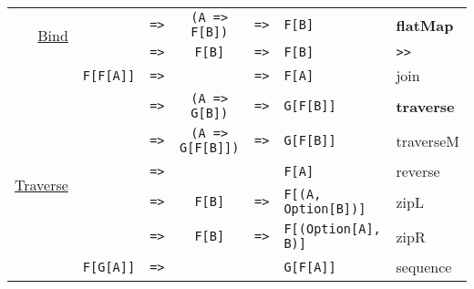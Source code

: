 \documentclass{tufte-handout}
\newcommand{\fa}{F[A]}
\newcommand{\fb}{F[B]}
\newcommand{\rarr}{\texttt{=>}}
\newcommand{\fTwo}[2]{\texttt{#1} & \rarr & & & \texttt{#2}}
\newcommand{\fThree}[3]{\texttt{#1} & \rarr & \texttt{#2} & \rarr & \texttt{#3}}
\newcommand{\sdocUrl}[1]{http://docs.typelevel.org/api/scalaz/stable/7.0.4/doc/\#scalaz.#1}
\newcommand{\sdocHref}[1]{\href{\sdocUrl{#1}}{#1}}
\begin{document}
\begin{table}[ht]
\begin{tabular}{rrcclll}
    \multirow{2}{*}{\sdocHref{Bind}}
      & \fThree{\multirow{2}{*}{\fa}}{(A => F[B])}{\fb} & \textbf{flatMap} \\
      & \fThree{}{\fb}{\fb} & \verb$>>$ \\
      & \fThree{F[F[A]]}{}{\fa} & join \\[.5cm]
    \multirow{6}{*}{\sdocHref{Traverse}}
      & \fThree{\multirow{5}{*}{\fa}}{(A => G[B])}{G[F[B]]} & \textbf{traverse} \\
      & \fThree{}{(A => G[F[B]])}{G[F[B]]} & traverseM \\
      & \fTwo{}{\fa} & reverse \\
      & \fThree{}{\fb}{F[(A, Option[B])]} & zipL \\
      & \fThree{}{\fb}{F[(Option[A], B)]} & zipR \\
      & \fTwo{F[G[A]]}{G[F[A]]} & sequence \\[.5cm]
  \end{tabular}
\end{table}

\end{document}
